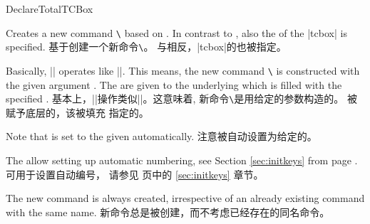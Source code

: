 \begin{docCommand}{DeclareTotalTCBox}{}

\begin{stripedbox}
Creates a new command \texttt{\textbackslash} based on .
In contrast to , also the  of the |tcbox| is specified.
\tcblower
基于创建一个新命令\texttt{\textbackslash}。%
与相反，|tcbox|的也被指定。
\end{stripedbox}

\begin{stripedbox}
Basically, |\DeclareTotalTCBox| operates like |\DeclareDocumentCommand|. This means,
the new command \texttt{\textbackslash} is constructed with the given argument .
The  are given to the underlying  which is filled with
the specified .
\tcblower
基本上，|\DeclareTotalTCBox|操作类似|\DeclareDocumentCommand|。这意味着,
新命令\texttt{\textbackslash}是用给定的参数构造的。
被赋予底层的，该被填充
指定的。
\end{stripedbox}
  

\begin{stripedbox}
Note that  is set to the given 
automatically.
\tcblower
注意被自动设置为给定的。
\end{stripedbox}


\begin{stripedbox}
The  allow setting up automatic numbering,
see Section \ref{sec:initkeys} from page \pageref{sec:initkeys}.
\tcblower
{}可用于设置自动编号，
请参见 \pageref{sec:initkeys} 页中的 \ref{sec:initkeys} 章节。
\end{stripedbox}


\begin{stripedbox}
The new command is always created, irrespective of an already existing
command with the same name.
\tcblower
新命令总是被创建，而不考虑已经存在的同名命令。
\end{stripedbox}

\end{docCommand}
